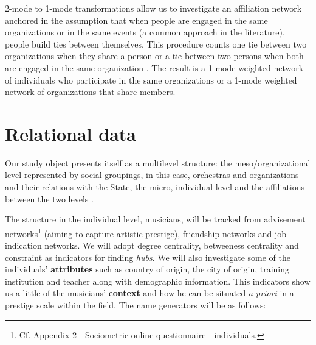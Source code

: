 \documentclass[a4paper, 12pt, openright, oneside, german, french, brazil, english]{abntex2}
\begin{document}
        2-mode to 1-mode transformations allow us to investigate an affiliation network anchored in the assumption that when people are engaged in the same organizations or in the same events (a common approach in the literature), people build ties between themselves. This procedure counts one tie between two organizations when they share a person or a tie between two persons when both are engaged in the same organization \cite{brailly2016market,lazega2014redes}. The result is a 1-mode weighted network of individuals who participate in the same organizations or a 1-mode weighted network of organizations that share members.


        \section{Relational data}

        Our study object presents itself as a multilevel structure: the meso/organizational level represented by social groupings, in this case, orchestras and organizations and their relations with the State, the micro, individual level and the affiliations between the two levels \cite{brailly2016market,eloire2009reseaux,lazega2008catching,favre2016inter,lazega2016synchronization}.
        

        The structure in the individual level, musicians, will be tracked from advisement networks\footnote{Cf. Appendix 2 - Sociometric online questionnaire - individuals.} (aiming to capture artistic prestige), friendship networks and job indication networks. We will adopt degree centrality, betweeness centrality and constraint as indicators for finding \textit{hubs}. We will also investigate some of the individuals' \textbf{attributes} such as country of origin, the city of origin, training institution and teacher along with demographic information. This indicators show us a little of the musicians' \textbf{context} and how he can be situated \textit{a priori} in a prestige scale within the field. The name generators will be as follows:
\end{document}
